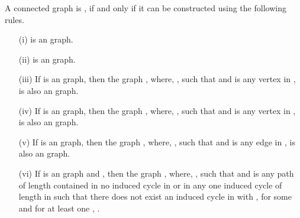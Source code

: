 \documentclass[runningheads]{llncs}
\begin{document}
\begin{theorem}
\label{construction}
A connected graph is , if and only if it can be constructed using the following rules.
\begin{itemize}
\item[(i)]  is an  graph.
\item[(ii)]  is an  graph.
\item[(iii)] If  is an  graph, then the graph , where, ,  such that  and  is any vertex in ,  is also an  graph.
\item[(iv)] If  is an  graph, then the graph , where, ,  such that  and  is any vertex in ,  is also an  graph.
\item[(v)] If  is an  graph, then the graph , where, ,  such that  and  is any edge in ,  is also an  graph.
\item[(vi)] If  is an  graph and , then the graph , where, ,  such that  and  is any path of length  contained in no induced cycle in  or in any one induced cycle  of length  in  such that there does not exist an induced cycle  in  with ,  for some  and for at least one , .
\end{itemize}
\end{theorem} 
\end{document}
